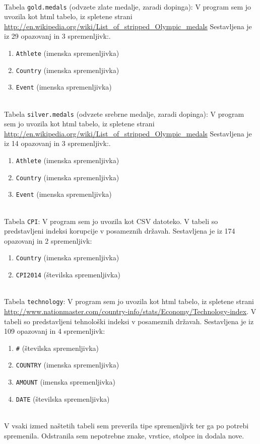 \documentclass[11pt,a4paper]{article}
\begin{document}
\
\\
Tabela \verb|gold.medals| (odvzete zlate medalje, zaradi dopinga):
V program sem jo uvozila kot html tabelo, iz spletene strani \url{http://en.wikipedia.org/wiki/List_of_stripped_Olympic_medals}
Sestavljena je iz 29 opazovanj in 3 spremenljivk:.
\begin{enumerate}
\item{\verb|Athlete| (imenska spremenljivka)}
\item{\verb|Country| (imenska spremenljivka)}
\item{\verb|Event| (imenska spremenljivka)}

\end{enumerate}

\pagebreak
\
\\
Tabela \verb|silver.medals| (odvzete srebrne medalje, zaradi dopinga):
V program sem jo uvozila kot html tabelo, iz spletene strani \url{http://en.wikipedia.org/wiki/List_of_stripped_Olympic_medals}
Sestavljena je iz 14 opazovanj in 3 spremenljivk:.
\begin{enumerate}
\item{\verb|Athlete| (imenska spremenljivka)}
\item{\verb|Country| (imenska spremenljivka)}
\item{\verb|Event| (imenska spremenljivka)}

\end{enumerate}
\
\\
Tabela \verb|CPI|:
V program sem jo uvozila kot CSV datoteko. V tabeli so predstavljeni indeksi korupcije v posameznih državah.
Sestavljena je iz 174 opazovanj in 2 spremenljivk:
\begin{enumerate}
\item{\verb|Country| (imenska spremenljivka)}
\item{\verb|CPI2014| (številska spremenljivka)}

\end{enumerate}
\
\\
Tabela \verb|technology|:
V program sem jo uvozila kot html tabelo, iz spletene strani \url{http://www.nationmaster.com/country-info/stats/Economy/Technology-index}.
V tabeli so predstavljeni tehnološki indeksi v posameznih državah.
Sestavljena je iz 109 opazovanj in 4 spremenljivk:
\begin{enumerate}

\item{\verb|#| (številska spremenljivka)}
\item{\verb|COUNTRY| (imenska spremenljivka)}
\item{\verb|AMOUNT| (imenska spremenljivka)}
\item{\verb|DATE| (številska spremenljivka)}
\end{enumerate}
\
\\
V vsaki izmed naštetih tabeli sem preverila tipe spremenljivk ter ga po potrebi spremenila. Odstranila sem nepotrebne znake, vrstice, stolpce in dodala nove.
\\
\end{document}
